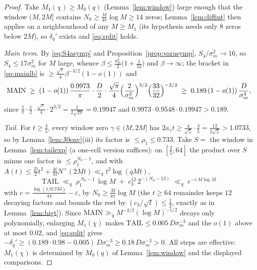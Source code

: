 \documentclass[11pt]{article}
\begin{document}
\begin{proof}
Take $M_1(\chi)\ge M_0(q)$ (Lemma~\ref{lem:window}) large enough that
the window $(M,2M]$ contains $N_0\ge\tfrac M{4\pi}\log M\ge14$ zeros;
Lemma~\ref{lem:diffint} then applies on a neighbourhood of any
$M\ge M_1$ (its hypothesis needs only $8$ zeros below $2M$), so
$\delta_q'$ exists and \eqref{eq:split} holds.

\emph{Main term.} By \eqref{eq:S4asymp} and
Proposition~\ref{prop:varasymp}, $S_4/\sigma_m^2\to16$, so
$S_4\le17\sigma_m^2$ for $M$ large, whence
$\beta\le\tfrac{\sigma_m^2}2\bigl(1+\tfrac1{32}\bigr)$ and
$\beta\to\infty$; the bracket in \eqref{eq:mainlb} is
$\ge\tfrac{\sqrt\pi}{4}\beta^{-3/2}(1-o(1))$ and
\[
\mathrm{MAIN}\;\ge\;(1-o(1))\,
\frac{0.9973}{\pi}\cdot\frac D2\cdot\frac{\sqrt\pi}4
\Bigl(\frac2{\sigma_m^2}\Bigr)^{3/2}
\Bigl(\frac{33}{32}\Bigr)^{-3/2}
\;\ge\;0.189\,(1-o(1))\,\frac D{\sigma_m^3},
\]
since $\frac1\pi\cdot\frac12\cdot\frac{\sqrt\pi}4\cdot2^{3/2}
=\frac1{2\sqrt{2\pi}}=0.19947$ and
$0.9973\cdot0.9548\cdot0.19947>0.189$.

\emph{Tail.} For $t\ge\tfrac35$, every window zero
$\gamma\in(M,2M]$ has $2a_\gamma t\ge\tfrac4{\sqrt5}\cdot\tfrac35
=\tfrac{12}{5\sqrt5}>1.0733$, so by Lemma~\ref{lem:J0env}(iii) its
factor is $\le\rho_1\le0.733$. Take $S=$ the window in
Lemma~\ref{lem:tailexp} (a one-cell version suffices): on
$[\tfrac35,64]$ the product over $S$ minus one factor is
$\le\rho_1^{N_0-1}$, and with
$A(t)\le\tfrac D2t^2+\tfrac{4t}MN^+(2Mt)\ll_q t^2\log(qMt)$,
\[
\mathrm{TAIL}\;\ll_q\;\rho_1^{\,N_0-1}\,\log M
\;+\;c_3^{12}\,2^{-(N_0-13)}
\;\ll_q\;e^{-c\,M\log M}
\]
with $c=\tfrac{\log(1/0.733)}{4\pi}-\varepsilon$, by
$N_0\ge\tfrac M{4\pi}\log M$ (the $t\ge64$ remainder keeps $12$
decaying factors and bounds the rest by
$(c_3/\sqrt t)\le\tfrac12$, exactly as in Lemma~\ref{lem:bigt}).
Since $\mathrm{MAIN}\gg_q M^{-3/2}(\log M)^{-1/2}$ decays only
polynomially, enlarging $M_1(\chi)$ makes
$\mathrm{TAIL}\le0.005\,D\sigma_m^{-3}$ and the $o(1)$ above at most
$0.02$, and \eqref{eq:split} gives
$-\delta_q'\ge(0.189\cdot0.98-0.005)\,D\sigma_m^{-3}
\ge0.18\,D\sigma_m^{-3}>0$. All steps are effective: $M_1(\chi)$ is
determined by $M_0(q)$ of Lemma~\ref{lem:window} and the displayed
comparisons.


\end{proof}
\end{document}
